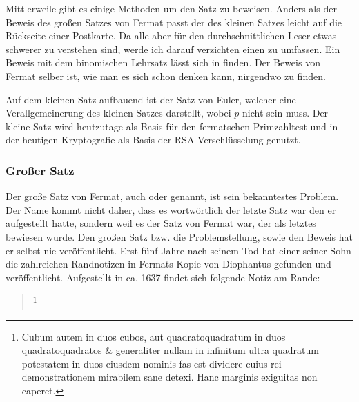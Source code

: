         Mittlerweile gibt es einige Methoden um den Satz zu beweisen. Anders als der Beweis des großen Satzes von Fermat passt der des kleinen Satzes leicht auf die Rückseite einer Postkarte. Da alle aber für den durchschnittlichen Leser etwas schwerer zu verstehen sind, werde ich darauf verzichten einen zu umfassen. Ein Beweis mit dem binomischen Lehrsatz lässt sich in \cite{wolframFlT} finden.  Der Beweis von Fermat selber ist, wie man es sich schon denken kann, nirgendwo zu finden.
        
        Auf dem kleinen Satz aufbauend ist der Satz von Euler, welcher eine Verallgemeinerung des kleinen Satzes darstellt, wobei $p$ nicht  sein muss. Der kleine Satz wird heutzutage als Basis für den fermatschen Primzahltest und in der heutigen Kryptografie als Basis der RSA-Verschlüsselung genutzt. 
    
    \subsubsection{Großer Satz} \label{sec:grSatz}
        Der große Satz von Fermat, auch  oder  genannt, ist sein bekanntestes Problem. Der Name  kommt nicht daher, dass es wortwörtlich der letzte Satz war den er aufgestellt hatte, sondern weil es der Satz von Fermat war, der als letztes bewiesen wurde. Den großen Satz bzw. die Problemstellung, sowie den Beweis hat er selbst nie veröffentlicht. Erst fünf Jahre nach seinem Tod hat einer seiner Sohn die zahlreichen Randnotizen in Fermats Kopie von Diophantus  gefunden und veröffentlicht. Aufgestellt in ca. 1637 findet sich folgende Notiz am Rande:
        
        \begin{quote}
            \textit{}
            \footnote{Cubum autem in duos cubos, aut quadratoquadratum in duos quadratoquadratos \& generaliter nullam in infinitum ultra quadratum potestatem in duos eiusdem nominis fas est dividere cuius rei demonstrationem mirabilem sane detexi. Hanc marginis exiguitas non caperet.}
        \end{quote}
        

